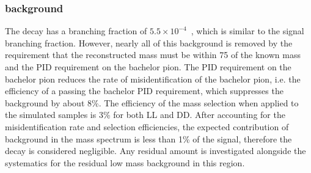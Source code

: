 \subsubsection{\boldmath \decay{\B}{\D\KS\kaon} background}
\label{sec:backgrounds:b2dkks}

The decay \decay{\Bm}{\D\KS\Km} has a branching fraction of $5.5 \times 10^{-4}$~\cite{PDG2014}, which is similar to the signal \decay{\Bm}{\D\Kstarm(\KS\pim)} branching fraction. However, nearly all of this background is removed by the requirement that the reconstructed \Kstarm mass must be within 75 \mevcc of the known \Kstar mass and the PID requirement on the bachelor pion. The PID requirement on the bachelor pion reduces the rate of misidentification of the bachelor pion, i.e. the efficiency of a \Km passing the bachelor PID requirement, which suppresses the background by about 8\%. The efficiency of the \Kstarm mass selection when applied to the simulated \decay{\Bm}{\D\KS\Km} samples is 3\% for both LL and DD. After accounting for the misidentification rate and selection efficiencies, the expected contribution of \decay{\Bm}{\D\KS\Km} background in the \kpi mass spectrum is less than 1\% of the signal, therefore the decay is considered negligible. Any residual amount is investigated alongside the systematics for the residual low mass background in this region.


%
%
%


